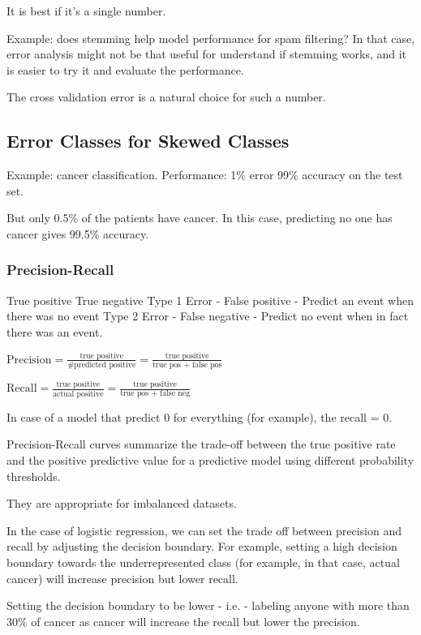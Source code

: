 It is best if it's a single number. 

Example: does stemming help model performance for spam filtering? 
In that case, error analysis might not be that useful for understand if stemming works, and it is easier to try it and evaluate the performance.

The cross validation error is a natural choice for such a number.

\subsection{Error Classes for Skewed Classes}

Example: cancer classification.
Performance: 1\% error 99\% accuracy on the test set.

But only 0.5\% of the patients have cancer. In this case, predicting no one has cancer gives 99.5\% accuracy.

\subsubsection{Precision-Recall}

True positive
True negative
Type 1 Error - False positive - Predict an event when there was no event
Type 2 Error - False negative - Predict no event when in fact there was an event.


$\text{Precision} = \frac{\text{true positive}}{\text{\# predicted positive}} = \frac{\text{true positive}}{\text{true pos + false pos}}$

$\text{Recall} = \frac{\text{true positive}}{\text{actual positive}} = 
\frac{\text{true positive}}{\text{true pos + false neg}} $

In case of a model that predict 0 for everything (for example), the recall = 0. 

Precision-Recall curves summarize the trade-off between the true positive rate and the positive predictive value for a predictive model using different probability thresholds.

They are appropriate for imbalanced datasets.

In the case of logistic regression, we can set the trade off between precision and recall by adjusting the decision boundary. For example, setting a high decision boundary towards the underrepresented class (for example, in that case, actual cancer) will increase precision but lower recall. 

Setting the decision boundary to be lower - i.e. - labeling anyone with more than 30\% of cancer as cancer will increase the recall but lower the precision.

